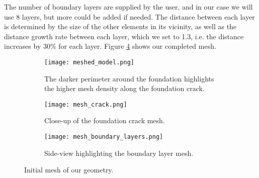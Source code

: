 The number of boundary layers are supplied by the user, and in our case we will use 8 layers, but more could be added if needed.
The distance between each layer is determined by the size of the other elements in its vicinity, as well as the distance growth rate between each layer, which we set to 1.3, i.e. the distance increases by 30\% for each layer.
Figure \ref{fig:mesh} shows our completed mesh.\par

\begin{figure}[htb!]
  \centering
  \begin{subfigure}[b]{\textwidth}
    \centering
    \texttt{[image: meshed\_model.png]}
    \caption{The darker perimeter around the foundation highlights the higher mesh density along the foundation crack.}
    \label{fig:meshed_geometry}
  \end{subfigure}
  \begin{subfigure}[b]{\textwidth}
    \centering
    \texttt{[image: mesh\_crack.png]}
    \caption{Close-up of the foundation crack mesh.}
    \label{fig:meshed_crack}
  \end{subfigure}
  \begin{subfigure}[b]{\textwidth}
    \centering
    \texttt{[image: mesh\_boundary\_layers.png]}
    \caption{Side-view highlighting the boundary layer mesh.}
    \label{fig:mesh_boundary_layers}
  \end{subfigure}
  \caption{Initial mesh of our geometry.}
  \label{fig:mesh}
\end{figure}
